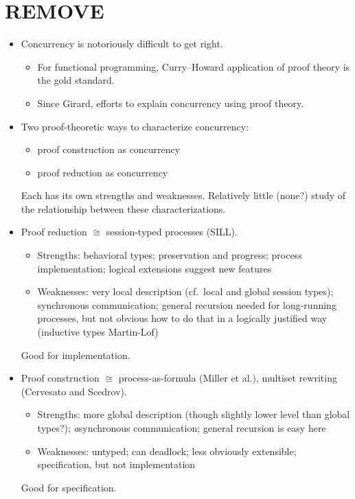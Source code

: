 \clearpage
\section{REMOVE}

\begin{itemize}
\item
  Concurrency is notoriously difficult to get right.
  \begin{itemize}[nosep]
  \item For functional programming, Curry--Howard application of proof theory is the gold standard.
  \item Since Girard, efforts to explain concurrency using proof theory.
  \end{itemize}

\item 
  Two proof-theoretic ways to characterize concurrency:
  \begin{itemize}[nosep]
  \item proof construction as concurrency
  \item proof reduction as concurrency
  \end{itemize}
  Each has its own strengths and weaknesses.
  Relatively little (none?) study of the relationship between these characterizations.

\item
  Proof reduction $\cong$ session-typed processes (SILL).
  \begin{itemize}[nosep]
  \item Strengths: behavioral types; preservation and progress; process implementation;
                   logical extensions suggest new features
  \item Weaknesses: very local description (cf.\ local and global session types);
                    synchronous communication; general recursion needed for long-running
                    processes, but not obvious how to do that in a logically justified way
                    (inductive types Martin-Lof)
  \end{itemize}
  Good for implementation.

\item
  Proof construction $\cong$ process-as-formula (Miller et al.),
                             multiset rewriting (Cervesato and Scedrov).
  \begin{itemize}[nosep]
  \item Strengths: more global description (though slightly lower level than global types?);
                   \emph{a}synchronous communication; general recursion is easy here
  \item Weaknesses: untyped; can deadlock; less obviously extensible;
                    specification, but not implementation
  \end{itemize}
  Good for specification.


\end{itemize}
